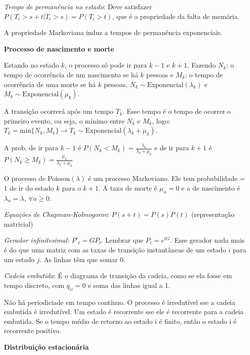 \documentclass[12pt]{article}
\begin{document}
\begin{multicols}{3}
		\textit{Tempo de permanência no estado}: Deve satisfazer $ P(T_i > s+t | T_i > s) = P(T_i > t) $, que é a propriedade da falta de memória. 
		
		A propriedade Markoviana induz a tempos de permanência exponenciais.
		
		\noindent\makebox[\columnwidth]{\rule{\columnwidth}{0.4pt}}
		
		\textbf{Processo de nascimento e morte}
		
		Estando no estado $ k $, o processo só pode ir para $ k-1 $ e $ k+1 $. Fazendo $ N_k $: o tempo de ocorrência de um nascimento se há $ k $ pessoas e $ M_k $: o tempo de ocorrência de uma morte se há $ k $ pessoas, $ N_k \sim \text{Exponencial}(\lambda_k) $ e $ M_k \sim \text{Exponencial}(\mu_k) $.
		
		A transição ocorrerá após um tempo $ T_k $. Esse tempo é o tempo de ocorrer o primeiro evento, ou seja, o mínimo entre $ N_k $ e $ M_k $, logo: $ T_k  = \text{min}\{N_k, M_k\} \to T_k \sim \text{Exponencial}(\lambda_k + \mu_k) $.
		
		A prob. de ir para $ k-1 $ é $ P(N_k < M_k) = \frac{\lambda_k}{\lambda_k + \mu_k} $ e de ir para $ k+1 $ é $ P(N_k \geq M_k) = \frac{\mu_k}{\lambda_k + \mu_k} $ 
		
		O processo de Poisson$ (\lambda) $ é um processo Markoviano. Ele tem probabilidade = 1 de ir do estado $ k $ para o $ k+1 $. A taxa de morte é $ \mu_n = 0 $ e a de nascimento é $ \lambda_n = \lambda $,  $ \forall n \geq 0 $.
		
		\textit{Equações de Chapman-Kolmogorov}: $ P(s+t) = P(s)P(t) $ (representação matricial)
		
		\textit{Gerador infinitesimal:} $ P'_t  = G P_t $. Lembrar que $ P_t = e^{tG} $. Esse gerador nada mais é do que uma matriz com as taxas de transição instantâneas de um estado $ i $ para um estado $ j $. As linhas têm que somar 0.
		
		\textit{Cadeia embutida}: É o diagrama de transição da cadeia, como se ela fosse em tempo discreto, com $ q_{ii} = 0 $ e soma das linhas igual a 1.
		
		Não há periodiciade em tempo contínuo. O processo é irredutível sse a cadeia embutida é irredutível. Um estado é recorrente sse ele é recorrente para a cadeia embutida. Se o tempo médio de retorno ao estado i é finito, então o estado i é recorrente positivo.
		
		\noindent\makebox[\columnwidth]{\rule{\columnwidth}{0.4pt}}
		
		\textbf{Distribuição estacionária}
		

\end{multicols}
\end{document}
